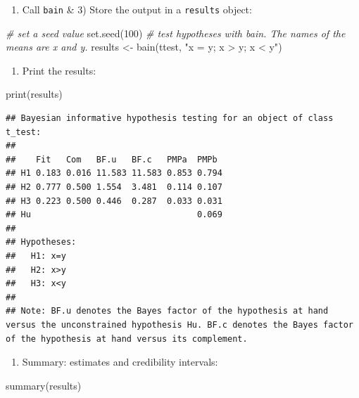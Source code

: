 \documentclass[
]{book}
\newenvironment{Shaded}{\begin{snugshade}}{\end{snugshade}}
\newcommand{\CommentTok}[1]{\textcolor[rgb]{0.56,0.35,0.01}{\textit{#1}}}
\newcommand{\DecValTok}[1]{\textcolor[rgb]{0.00,0.00,0.81}{#1}}
\newcommand{\FunctionTok}[1]{\textcolor[rgb]{0.00,0.00,0.00}{#1}}
\newcommand{\NormalTok}[1]{#1}
\newcommand{\OtherTok}[1]{\textcolor[rgb]{0.56,0.35,0.01}{#1}}
\newcommand{\StringTok}[1]{\textcolor[rgb]{0.31,0.60,0.02}{#1}}
\providecommand{\tightlist}{%
  \setlength{\itemsep}{0pt}\setlength{\parskip}{0pt}}
\begin{document}
\begin{enumerate}
\def\labelenumi{\arabic{enumi})}
\setcounter{enumi}{1}
\tightlist
\item
  Call \texttt{bain} \& 3) Store the output in a \texttt{results} object:
\end{enumerate}

\begin{Shaded}
\begin{Highlighting}[]
\CommentTok{\# set a seed value}
\FunctionTok{set.seed}\NormalTok{(}\DecValTok{100}\NormalTok{)}
\CommentTok{\# test hypotheses with bain. The names of the means are x and y.}
\NormalTok{results }\OtherTok{\textless{}{-}} \FunctionTok{bain}\NormalTok{(ttest, }\StringTok{"x = y; x \textgreater{} y; x \textless{} y"}\NormalTok{)}
\end{Highlighting}
\end{Shaded}

\begin{enumerate}
\def\labelenumi{\arabic{enumi})}
\setcounter{enumi}{2}
\tightlist
\item
  Print the results:
\end{enumerate}

\begin{Shaded}
\begin{Highlighting}[]
\FunctionTok{print}\NormalTok{(results)}
\end{Highlighting}
\end{Shaded}

\begin{verbatim}
## Bayesian informative hypothesis testing for an object of class t_test:
## 
##    Fit   Com   BF.u   BF.c   PMPa  PMPb 
## H1 0.183 0.016 11.583 11.583 0.853 0.794
## H2 0.777 0.500 1.554  3.481  0.114 0.107
## H3 0.223 0.500 0.446  0.287  0.033 0.031
## Hu                                 0.069
## 
## Hypotheses:
##   H1: x=y
##   H2: x>y
##   H3: x<y
## 
## Note: BF.u denotes the Bayes factor of the hypothesis at hand versus the unconstrained hypothesis Hu. BF.c denotes the Bayes factor of the hypothesis at hand versus its complement.
\end{verbatim}

\begin{enumerate}
\def\labelenumi{\arabic{enumi})}
\setcounter{enumi}{3}
\tightlist
\item
  Summary: estimates and credibility intervals:
\end{enumerate}

\begin{Shaded}
\begin{Highlighting}[]
\FunctionTok{summary}\NormalTok{(results)}
\end{Highlighting}
\end{Shaded}
\end{document}
